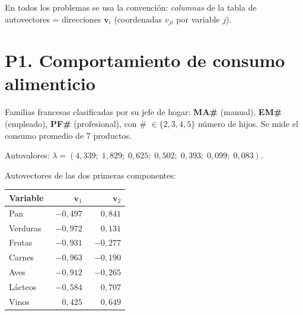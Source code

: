 \documentclass[11pt,a4paper]{article}
\begin{document}
\noindent En todos los problemas se usa la convención: \emph{columnas} de la tabla de autovectores = direcciones $\bm v_i$ (coordenadas $v_{ji}$ por variable $j$).

\newpage
\section{P1. Comportamiento de consumo alimenticio}

\begin{enuncbox}
Familias francesas clasificadas por su jefe de hogar: \textbf{MA\#} (manual), \textbf{EM\#} (empleado), \textbf{PF\#} (profesional), con \# $\in\{2,3,4,5\}$ número de hijos. Se mide el consumo promedio de 7 productos.

\medskip
Autovalores: $\lambda=(4{,}339;\;1{,}829;\;0{,}625;\;0{,}502;\;0{,}393;\;0{,}099;\;0{,}083)$.

\smallskip
Autovectores de las dos primeras componentes:

\begin{center}\small
\begin{tabular}{lrr}\toprule
Variable & $\bm v_1$ & $\bm v_2$ \\\midrule
Pan      & $-0{,}497$ & $\phantom{-}0{,}841$ \\
Verduras & $-0{,}972$ & $\phantom{-}0{,}131$ \\
Frutas   & $-0{,}931$ & $-0{,}277$ \\
Carnes   & $-0{,}963$ & $-0{,}190$ \\
Aves     & $-0{,}912$ & $-0{,}265$ \\
Lácteos  & $-0{,}584$ & $\phantom{-}0{,}707$ \\
Vinos    & $\phantom{-}0{,}425$ & $\phantom{-}0{,}649$ \\\bottomrule
\end{tabular}
\end{center}
\end{enuncbox}
\end{document}
